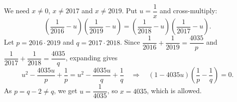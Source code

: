 We need $x\ne0$, $x\ne2017$ and $x\ne2019$. Put $u=\dfrac{1}{x}$ and cross-multiply:
\[
\left(\dfrac{1}{2016}-u\right)\left(\dfrac{1}{2019}-u\right)=\left(\dfrac{1}{2018}-u\right)\left(\dfrac{1}{2017}-u\right).
\]
Let $p=2016\cdot2019$ and $q=2017\cdot2018$. Since $\dfrac{1}{2016}+\dfrac{1}{2019}=\dfrac{4035}{p}$ and $\dfrac{1}{2017}+\dfrac{1}{2018}=\dfrac{4035}{q}$, expanding gives
\[
u^2-\dfrac{4035u}{p}+\dfrac{1}{p}=u^2-\dfrac{4035u}{q}+\dfrac{1}{q}
\quad\Longrightarrow\quad
(1-4035u)\left(\dfrac{1}{p}-\dfrac{1}{q}\right)=0 .
\]
As $p=q-2\ne q$, we get $u=\dfrac{1}{4035}$, so $x=\boxed{4035}$, which is allowed.
